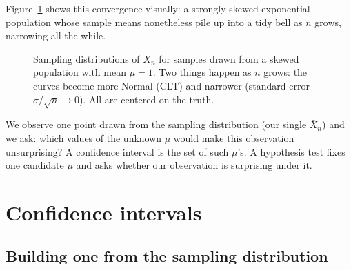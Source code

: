 Figure~\ref{ch32:fig-sampling} shows this convergence visually: a strongly skewed
exponential population whose sample means nonetheless pile up into a tidy
bell as $n$ grows, narrowing all the while.

\begin{figure}[H]
\centering
{}
\caption{Sampling distributions of $\bar X_n$ for samples drawn from a skewed
population with mean $\mu=1$. Two things happen as $n$ grows: the curves become more
Normal (CLT) and narrower (standard error $\sigma/\sqrt n \to 0$). All are centered on
the truth.}
\label{ch32:fig-sampling}
\end{figure}

\begin{happeningbox}
We observe one point drawn from the
sampling distribution (our single $\bar X_n$) and we ask: which values of the unknown
$\mu$ would make this observation unsurprising? A confidence interval is the set of
such $\mu$'s. A hypothesis test fixes one candidate $\mu$ and asks whether our
observation is surprising under it.
\end{happeningbox}

\section{Confidence intervals}
\label{ch32:ci}

\subsection{Building one from the sampling distribution}

